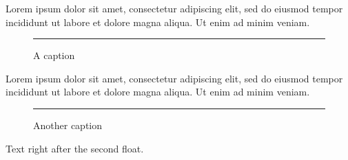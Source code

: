 \documentclass{article}
\begin{document}
Lorem ipsum dolor sit amet, consectetur adipiscing elit, sed do eiusmod tempor
incididunt ut labore et dolore magna aliqua. Ut enim ad minim veniam.

\begin{figure}[h]
\centering
\rule{4cm}{3cm}
\caption{A caption}
\end{figure}

Lorem ipsum dolor sit amet, consectetur adipiscing elit, sed do eiusmod tempor
incididunt ut labore et dolore magna aliqua. Ut enim ad minim veniam.

\begin{figure}[h]
\centering
\rule{4cm}{2cm}
\caption{Another caption}
\end{figure}
Text right after the second float.
\end{document}
